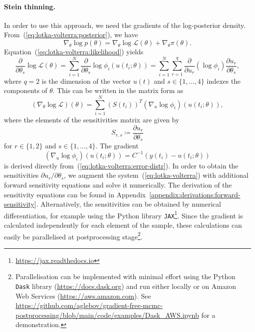 \documentclass[11pt,a4paper]{report}
\begin{document}
\paragraph{Stein thinning.} In order to use this approach, we need the gradients of the log-posterior density. From~(\ref{eq:lotka-volterra:posterior}), we have
\begin{equation*}
\nabla_{\theta} \log p(\theta) = \nabla_{\theta} \log \mathcal{L}(\theta) + \nabla_{\theta} \pi(\theta).
\end{equation*}
Equation~(\ref{eq:lotka-volterra:likelihood}) yields
\begin{equation*}
\frac{\partial}{\partial \theta_s} \log \mathcal{L}(\theta) 
= \sum_{i=1}^N \frac{\partial}{\partial \theta_s} \log \phi_i(u(t_i; \theta))
= \sum_{i=1}^N \sum_{r=1}^q \frac{\partial}{\partial u_r} (\log \phi_i) \frac{\partial u_r}{\partial \theta_s},
\end{equation*}
where $q = 2$ is the dimension of the vector $u(t)$ and $s \in \{1, \dots, 4\}$ indexes the components of $\theta$. This can be written in the matrix form as
\begin{equation*}
(\nabla_{\theta} \log \mathcal{L})(\theta) = \sum_{i=1}^N (S(t_i))^T (\nabla_{u} \log \phi_i)(u(t_i; \theta)),
\end{equation*}
where the elements of the sensitivities matrix are given by
\begin{equation*}
S_{r,s} \coloneq \frac{\partial u_r}{\partial \theta_s}
\end{equation*}
for $r \in \{1, 2\}$ and $s \in \{1, \dots, 4\}$.
The gradient
\begin{equation*}
(\nabla_u \log \phi_i)(u(t_i; \theta)) = C^{-1}(y(t_i) - u(t_i; \theta))
\end{equation*}
is derived directly from~(\ref{eq:lotka-volterra:error-distr}). In order to obtain the sensitivities $\partial u_r / \partial \theta_s$, we augment the system~(\ref{eq:lotka-volterra}) with additional forward sensitivity equations and solve it numerically. The derivation of the sensitivity equations can be found in Appendix~\ref{appendix:derivations:forward-sensitivity}. Alternatively, the sensitivities can be obtained by numerical differentiation, for example using the Python library \texttt{JAX}\footnote{\url{https://jax.readthedocs.io}}. Since the gradient is calculated independently for each element of the sample, these calculations can easily be parallelised at postprocessing stage\footnote{Parallelisation can be implemented with minimal effort using the Python \texttt{Dask} library (\url{https://docs.dask.org}) and run either locally or on Amazon Web Services (\url{https://aws.amazon.com}). See \url{https://github.com/aglebov/gradient-free-mcmc-postprocessing/blob/main/code/examples/Dask_AWS.ipynb} for a demonstration.}.
\end{document}
